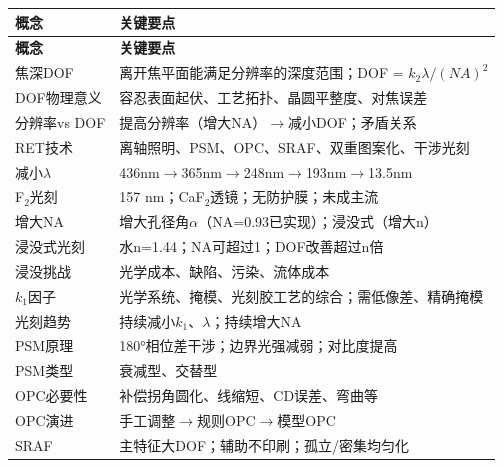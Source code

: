 \documentclass[UTF8,12pt,a4paper]{ctexart}
\begin{document}
\begin{longtable}{|L{4.5cm}|L{10.5cm}|}
\hline
\textbf{概念} & \textbf{关键要点} \\
\hline
\endfirsthead
\hline
\textbf{概念} & \textbf{关键要点} \\
\hline
\endhead
\hline
\endfoot

焦深DOF & 离开焦平面能满足分辨率的深度范围；DOF = $k_2\lambda/(NA)^2$ \\
\hline

DOF物理意义 & 容忍表面起伏、工艺拓扑、晶圆平整度、对焦误差 \\
\hline

分辨率vs DOF & 提高分辨率（增大NA）$\rightarrow$减小DOF；矛盾关系 \\
\hline

RET技术 & 离轴照明、PSM、OPC、SRAF、双重图案化、干涉光刻 \\
\hline

减小$\lambda$ & 436nm$\rightarrow$365nm$\rightarrow$248nm$\rightarrow$193nm$\rightarrow$13.5nm \\
\hline

F$_2$光刻 & 157 nm；CaF$_2$透镜；无防护膜；未成主流 \\
\hline

增大NA & 增大孔径角$\alpha$（NA=0.93已实现）；浸没式（增大n） \\
\hline

浸没式光刻 & 水n=1.44；NA可超过1；DOF改善超过n倍 \\
\hline

浸没挑战 & 光学成本、缺陷、污染、流体成本 \\
\hline

$k_1$因子 & 光学系统、掩模、光刻胶工艺的综合；需低像差、精确掩模 \\
\hline

光刻趋势 & 持续减小$k_1$、$\lambda$；持续增大NA \\
\hline

PSM原理 & 180°相位差干涉；边界光强减弱；对比度提高 \\
\hline

PSM类型 & 衰减型、交替型 \\
\hline

OPC必要性 & 补偿拐角圆化、线缩短、CD误差、弯曲等 \\
\hline

OPC演进 & 手工调整$\rightarrow$规则OPC$\rightarrow$模型OPC \\
\hline

SRAF & 主特征大DOF；辅助不印刷；孤立/密集均匀化 \\
\hline


\end{longtable}
\end{document}
